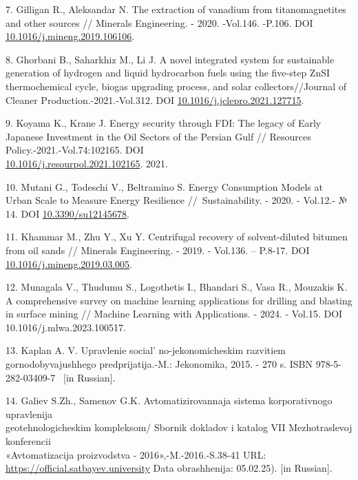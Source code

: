 \begin{references}
7. Gilligan R., Aleksandar N. The extraction of vanadium from
titanomagnetites and other sources // Minerals Engineering. - 2020.
-Vol.146. -P.106. DOI
\href{https://doi.org/10.1016/j.mineng.2019.106106}{10.1016/j.mineng.2019.106106}.

8. Ghorbani B., Saharkhiz M., Li J. A novel integrated system for
sustainable generation of hydrogen and liquid hydrocarbon fuels using
the five-step ZnSI thermochemical cycle, biogas upgrading process, and
solar collectors//Journal of Cleaner Production.-2021.-Vol.312. DOI
\href{https://doi.org/10.1016/j.jclepro.2021.127715}{10.1016/j.jclepro.2021.127715}.

9. Koyama K., Krane J. Energy security through FDI: The legacy of Early
Japanese Investment in the Oil Sectors of the Persian Gulf //
Resources Policy.-2021.-Vol.74:102165. DOI\\
\href{https://doi.org/10.1016/j.resourpol.2021.102165}{10.1016/j.resourpol.2021.102165}.
2021.

10. Mutani G., Todeschi V., Beltramino S. Energy Consumption Models at
Urban Scale to Measure Energy Resilience //~Sustainability. - 2020. -
Vol.12.- № 14. DOI
\href{https://doi.org/10.3390/su12145678}{10.3390/su12145678}.

11. Khammar M., Zhu Y., Xu Y. Centrifugal recovery of solvent-diluted
bitumen from oil sands // Minerals Engineering. - 2019. - Vol.136. --
P.8-17. DOI
\href{https://doi.org/10.1016/j.mineng.2019.03.005}{10.1016/j.mineng.2019.03.005}.

12. Munagala V., Thudumu S., Logothetis I., Bhandari S., Vasa R., Mouzakis
K. A comprehensive survey on machine learning applications for
drilling and blasting in surface mining // Machine Learning with
Applications. - 2024. - Vol.15. DOI 10.1016/j.mlwa.2023.100517.

13. Kaplan A. V. Upravlenie social' no-jekonomicheskim
razvitiem gornodobyvajushhego predprijatija.-M.: Jekonomika, 2015. -
270 s. ISBN 978-5-282-03409-7~ {[}in Russian{]}.

14. Galiev S.Zh., Samenov G.K. Avtomatizirovannaja sistema korporativnogo
upravlenija \\geotehnologicheskim kompleksom/ Sbornik dokladov i katalog
VII Mezhotraslevoj konferencii \\«Avtomatizacija proizvodstva -
2016»,-M.-2016.-S.38-41 URL:
\href{https://official.satbayev.university/download/document/42896/МАГ_2024}{https://official.satbayev.university}
Data obrashhenija: 05.02.25). {[}in Russian{]}.


\end{references}
